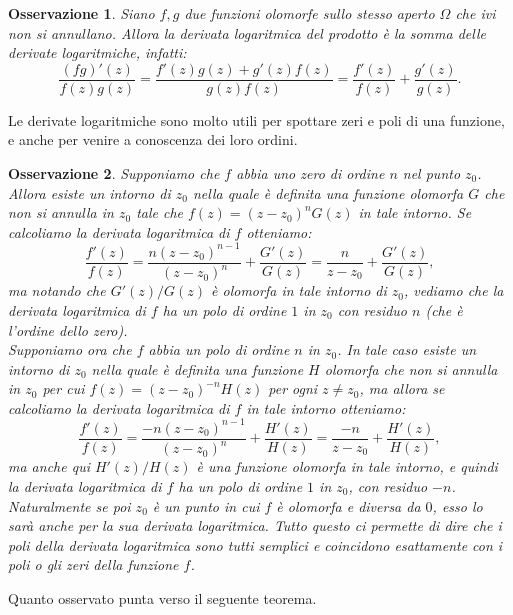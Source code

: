\documentclass[11pt]{book}
\theoremstyle{Definizione}
\theoremstyle{TeoremaProposizioneLemmaCorollarioCongettura}
\theoremstyle{OsservazioneNotaEsempio}
\newtheorem{myobs}{Osservazione}[section]
\begin{document}
\begin{myobs}
Siano $f,g$ due funzioni olomorfe sullo stesso aperto $\Omega$ che ivi non si annullano. Allora la derivata logaritmica del prodotto è la somma delle derivate logaritmiche, infatti:
$$
\frac{(fg)'(z)}{f(z)g(z)} = \frac{f'(z)g(z)+g'(z)f(z)}{g(z)f(z)} = \frac{f'(z)}{f(z)}+\frac{g'(z)}{g(z)}.
$$
\end{myobs}
Le derivate logaritmiche sono molto utili per spottare zeri e poli di una funzione, e anche per venire a conoscenza dei loro ordini.
\begin{myobs}
Supponiamo che $f$ abbia uno zero di ordine $n$ nel punto $z_0$. Allora esiste un intorno di $z_0$ nella quale è definita una funzione olomorfa $G$ che non si annulla in $z_0$ tale che $f(z) = (z-z_0)^n G(z)$ in tale intorno. Se calcoliamo la derivata logaritmica di $f$ otteniamo:
$$
\frac{f'(z)}{f(z)} = \frac{n(z-z_0)^{n-1}}{(z-z_0)^n}+\frac{G'(z)}{G(z)} = \frac{n}{z-z_0}+\frac{G'(z)}{G(z)},
$$
ma notando che $G'(z)/G(z)$ è olomorfa in tale intorno di $z_0$, vediamo che la derivata logaritmica di $f$ ha un polo di ordine $1$ in $z_0$ con residuo $n$ (che è l'ordine dello zero).\\
Supponiamo ora che $f$ abbia un polo di ordine $n$ in $z_0$. In tale caso esiste un intorno di $z_0$ nella quale è definita una funzione $H$ olomorfa che non si annulla in $z_0$ per cui $f(z) = (z-z_0)^{-n}H(z)$ per ogni $z \neq z_0$, ma allora se calcoliamo la derivata logaritmica di $f$ in tale intorno otteniamo:
$$
\frac{f'(z)}{f(z)} = \frac{-n(z-z_0)^{n-1}}{(z-z_0)^n}+\frac{H'(z)}{H(z)} = \frac{-n}{z-z_0}+\frac{H'(z)}{H(z)},
$$
ma anche qui $H'(z)/H(z)$ è una funzione olomorfa in tale intorno, e quindi la derivata logaritmica di $f$ ha un polo di ordine $1$ in $z_0$, con residuo $-n$.\\
Naturalmente se poi $z_0$ è un punto in cui $f$ è olomorfa e diversa da $0$, esso lo sarà anche per la sua derivata logaritmica. Tutto questo ci permette di dire che i poli della derivata logaritmica sono tutti semplici e coincidono esattamente con i poli o gli zeri della funzione $f$.
\end{myobs}
Quanto osservato punta verso il seguente teorema.
\end{document}
